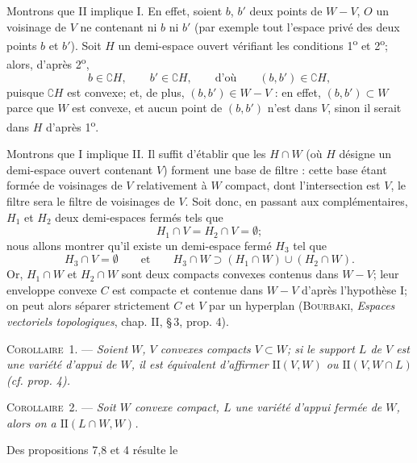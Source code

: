 \documentclass[11pt]{article}
\newcommand{\bzcf}[2]{#1}
\newcommand{\bznum}[1]{\if\relax\detokenize{#1}\relax\else\ #1\fi}
\newenvironment{corollaire}[1][]{\par\medskip\noindent\textsc{Corollaire\bznum{#1}.} --- \itshape}{\par\medskip}
\newenvironment{proof}[1][]{\par}{\par}
\begin{document}
\begin{proof}
Montrons que II implique I. En effet, soient $b$, $b'$ deux points de $W-V$, $O$ un voisinage de
$V$ ne contenant ni $b$ ni $b'$ (par exemple tout l'espace privé des deux points $b$ et $b'$).
Soit $H$ un demi-espace ouvert vérifiant les conditions 1\textsuperscript{o} et
2\textsuperscript{o}; alors, d'après 2\textsuperscript{o},
\[ b\in\complement H,\qquad b'\in\complement H,\qquad\text{d'où}\qquad(b, b')\in\complement H, \]
puisque $\complement H$ est convexe; et, de plus, $(b, b')\in W-V$ : en effet, $(b, b')\subset W$
parce que $W$ est convexe, et aucun point de $(b, b')$ n'est dans $V$, sinon il serait dans $H$
d'après 1\textsuperscript{o}.

Montrons que I implique II. Il suffit d'établir que les $H\cap W$ (où $H$ désigne un demi-espace
ouvert contenant $V$) forment une base de filtre : cette base étant formée de voisinages de $V$
relativement à $W$ compact, dont l'intersection est $V$, le filtre sera le filtre de voisinages
de $V$. Soit donc, en passant aux complémentaires, $H_1$ et $H_2$ deux demi-espaces fermés tels
que
\[ H_1\cap V=H_2\cap V=\emptyset; \]
nous allons montrer qu'il existe un demi-espace fermé $H_3$ tel que
\[ H_3\cap V=\emptyset\qquad\text{et}\qquad H_3\cap W\supset(H_1\cap W)\cup(H_2\cap W). \]
Or, $H_1\cap W$ et $H_2\cap W$ sont deux compacts convexes contenus dans $W-V$; leur enveloppe
convexe $C$ est compacte et contenue dans $W-V$ d'après l'hypothèse I; on peut alors séparer
strictement $C$ et $V$ par un hyperplan (\textsc{Bourbaki}, \textit{Espaces vectoriels
topologiques}, chap. II, \S\,3, prop. 4).
\end{proof}

\begin{corollaire}[1]
Soient $W$, $V$ convexes compacts $V\subset W$; si le support $L$ de $V$ est une variété d'appui
de $W$, il est équivalent d'affirmer $\mathrm{II}(V, W)$ ou $\mathrm{II}(V, W\cap L)$
(\bzcf{\textit{cf.} prop. 4}{\ref{bzprop:c3s5p4_propriete_I_appui}}).
\end{corollaire}

\begin{corollaire}[2]
Soit $W$ convexe compact, $L$ une variété d'appui fermée de $W$, alors on a
$\mathrm{II}(L\cap W, W)$.
\end{corollaire}

Des \bzcf{propositions 7}{\ref{bzprop:c3s5p7_hyperplan_separant}},\bzcf{8}{\ref{bzprop:c3s5p8_proprietes_I_II}}
et \bzcf{4}{\ref{bzprop:c3s5p4_propriete_I_appui}} résulte le
\end{document}
